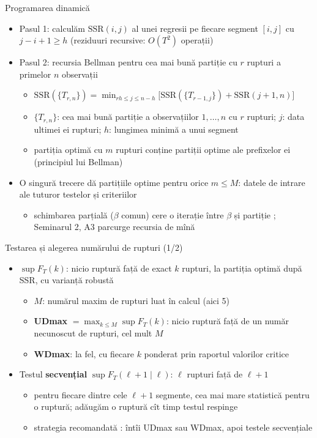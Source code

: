 \begin{frame}{Programarea dinamică}
\itemsize{\small}
\begin{itemize}
    \item Pasul 1: calculăm $\mathrm{SSR}(i, j)$ al unei regresii pe fiecare segment $[i, j]$ cu $j - i + 1 \ge h$ (reziduuri recursive: $O(T^2)$ operații)
    \item Pasul 2: recursia Bellman pentru cea mai bună partiție cu $r$ rupturi a primelor $n$ observații
    \begin{itemize}
        \item $\mathrm{SSR}(\{T_{r,n}\}) = \min_{rh \le j \le n - h}\big[\mathrm{SSR}(\{T_{r-1,j}\}) + \mathrm{SSR}(j + 1, n)\big]$
        \item $\{T_{r,n}\}$: cea mai bună partiție a observațiilor $1, \dots, n$ cu $r$ rupturi; $j$: data ultimei ei rupturi; $h$: lungimea minimă a unui segment
        \item partiția optimă cu $m$ rupturi conține partiții optime ale prefixelor ei (principiul lui Bellman)
    \end{itemize}
    \item O singură trecere dă partițiile optime pentru orice $m \le M$: datele de intrare ale tuturor testelor și criteriilor
    \begin{itemize}
        \item schimbarea parțială ($\beta$ comun) cere o iterație între $\beta$ și partiție ; Seminarul 2, A3 parcurge recursia de mînă
    \end{itemize}
\end{itemize}
\end{frame}

\begin{frame}{Testarea și alegerea numărului de rupturi (1/2)}
\itemsize{\small}
\begin{itemize}
    \item $\sup F_T(k)$: nicio ruptură față de exact $k$ rupturi, la partiția optimă după SSR, cu varianță robustă 
    \begin{itemize}
        \item $M$: numărul maxim de rupturi luat în calcul (aici 5)
        \item \textbf{UDmax} $= \max_{k \le M}\sup F_T(k)$: nicio ruptură față de un număr necunoscut de rupturi, cel mult $M$
        \item \textbf{WDmax}: la fel, cu fiecare $k$ ponderat prin raportul valorilor critice
    \end{itemize}
    \item Testul \textbf{secvențial} $\sup F_T(\ell + 1 \mid \ell)$: $\ell$ rupturi față de $\ell + 1$
    \begin{itemize}
        \item pentru fiecare dintre cele $\ell + 1$ segmente, cea mai mare statistică pentru o ruptură; adăugăm o ruptură cît timp testul respinge
        \item strategia recomandată : întîi UDmax sau WDmax, apoi testele secvențiale
    \end{itemize}
\end{itemize}
\end{frame}

